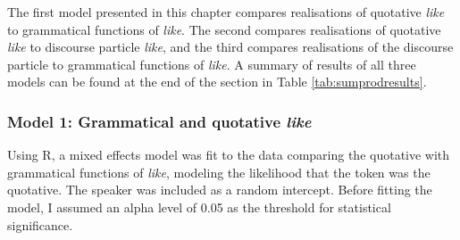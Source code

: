 The first model presented in this chapter compares realisations of quotative \textit{like} to grammatical functions of \textit{like}.  The second compares realisations of quotative \textit{like} to discourse particle \textit{like}, and the third compares realisations of the discourse particle to grammatical functions of \textit{like}.  A summary of results of all three models can be found at the end of the section in Table \ref{tab:sumprodresults}. 

\subsubsection{Model 1: Grammatical and quotative \textit{like}}

Using R, a mixed effects model was fit to the data comparing the quotative with grammatical functions of \textit{like}, modeling the likelihood that the token was the quotative.  The speaker was included as a random intercept.    Before fitting the model, I assumed an alpha level of 0.05 as the threshold for statistical significance.  


